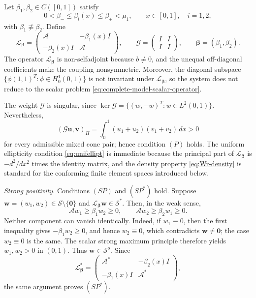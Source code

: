 \documentclass[preprint,10pt]{elsarticle}
\theoremstyle{plain}
\theoremstyle{definition}
\theoremstyle{remark}
\begin{document}
Let $\beta_1,\beta_2\in C([0,1])$ satisfy
\begin{equation}\label{eq:complete-model-coupling-bounds}
	0<\beta_-\le\beta_i(x)\le\beta_+<\mu_1,
	\qquad x\in[0,1],\quad i=1,2,
\end{equation}
with $\beta_1\not\equiv\beta_2$. Define
\begin{equation}\label{eq:complete-model-pencil}
	\mathcal L_{\boldsymbol\beta}
	=\begin{pmatrix}\mathcal A&-\beta_1(x)I\\-\beta_2(x)I&\mathcal A\end{pmatrix},
	\qquad
	\mathcal G=\begin{pmatrix}I&I\\I&I\end{pmatrix},
	\qquad
	\boldsymbol\beta=(\beta_1,\beta_2).
\end{equation}
The operator $\mathcal L_{\boldsymbol\beta}$ is non-selfadjoint because
$b\ne0$, and the unequal off-diagonal coefficients make the coupling
nonsymmetric. Moreover, the diagonal subspace
$\{\phi(1,1)^T:\phi\in H_0^1(0,1)\}$ is not invariant under
$\mathcal L_{\boldsymbol\beta}$, so the system does not reduce to the scalar
problem \eqref{eq:complete-model-scalar-operator}.

The weight $\mathcal G$ is singular, since
$\ker\mathcal G=\{(w,-w)^T:w\in L^2(0,1)\}$. Nevertheless,
\[
(\mathcal G\mathbf u,\mathbf v)_H
=\int_0^1(u_1+u_2)(v_1+v_2)\,dx>0
\]
for every admissible mixed cone pair; hence condition $(P)$ holds. The uniform
ellipticity condition \eqref{eq:unifellipt} is immediate because the principal
part of $\mathcal L_{\boldsymbol\beta}$ is $-d^2/dx^2$ times the identity
matrix, and the density property \eqref{eq:Wr-density} is standard for the
conforming finite element spaces introduced below.

\smallskip
\noindent\textit{Strong positivity.}
Conditions $(SP)$ and $(SP^*)$ hold. Suppose
$\mathbf w=(w_1,w_2)\in\mathcal S\setminus\{\mathbf0\}$ and
$\mathcal L_{\boldsymbol\beta}\mathbf w\in\mathcal S^*$. Then, in the weak
sense,
\[
\mathcal Aw_1\ge\beta_1w_2\ge0, \qquad
\mathcal Aw_2\ge\beta_2w_1\ge0.
\]
Neither component can vanish identically. Indeed, if $w_1\equiv0$, then the
first inequality gives $-\beta_1w_2\ge0$, and hence $w_2\equiv0$, which
contradicts $\mathbf w\ne\mathbf0$; the case $w_2\equiv0$ is the same.
The scalar strong maximum principle therefore yields $w_1,w_2>0$ in $(0,1)$.
Thus $\mathbf w\in\mathcal S^o$. Since
\[
\mathcal L_{\boldsymbol\beta}^*
=\begin{pmatrix}\mathcal A^*&-\beta_2(x)I\\-\beta_1(x)I&\mathcal A^*\end{pmatrix},
\]
the same argument proves $(SP^*)$.
\end{document}
